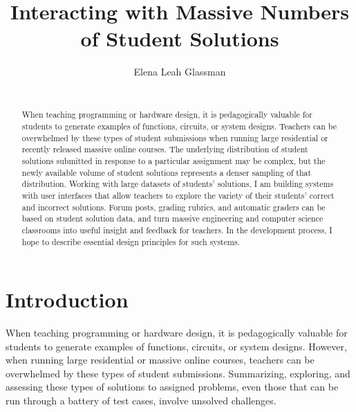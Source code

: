 \documentclass{sigchi}
\begin{document}
\title{Interacting with Massive Numbers of Student Solutions}

\author{
\alignauthor Elena Leah Glassman \\
 \\
}

\maketitle

\begin{abstract}
When teaching programming or hardware design, it is pedagogically valuable for students to generate examples of functions, circuits, or system designs. Teachers can be overwhelmed by these types of student submissions when running large residential or recently released massive online courses. The underlying distribution of student solutions submitted in response to a particular assignment may be complex, but the newly available volume of student solutions represents a denser sampling of that distribution. Working with large datasets of students' solutions, I am building systems with user interfaces that allow teachers to explore the variety of their students' correct and incorrect solutions. Forum posts, grading rubrics, and automatic graders can be based on student solution data, and turn massive engineering and computer science classrooms into useful insight and feedback for teachers. In the development process, I hope to describe essential design principles for such systems.
\end{abstract}



\section{Introduction}

When teaching programming or hardware design, it is pedagogically valuable for students to generate examples of functions, circuits, or system designs. However, when running large residential or massive online courses, teachers can be overwhelmed by these types of student submissions. Summarizing, exploring, and assessing these types of solutions to assigned problems, even those that can be run through a battery of test cases, involve unsolved challenges.
\end{document}
